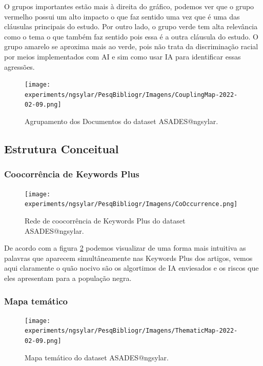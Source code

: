 O grupos importantes estão mais à direita do gráfico, podemos ver que o grupo vermelho possui um alto impacto o que faz sentido uma vez que é uma das cláusulas principais do estudo. Por outro lado, o grupo verde tem alta relevância como o tema o que também faz sentido pois essa é a outra cláusula do estudo. O grupo amarelo se aproxima mais ao verde, pois não trata da discriminação racial por meios implementados com AI e sim como usar IA para identificar essas agressões. 

\begin{figure}
    \centering
\texttt{[image: experiments/ngsylar/PesqBibliogr/Imagens/CouplingMap-2022-02-09.png]}
    \caption{Agrupamento dos Documentos do dataset ASADES@ngsylar.}
    \label{fig:ASADES@ngsylar:Coupling}
\end{figure}


\subsection{Estrutura Conceitual}

\subsubsection{Coocorrência de Keywords Plus}

\begin{figure}
    \centering
\texttt{[image: experiments/ngsylar/PesqBibliogr/Imagens/CoOccurrence.png]}
    \caption{Rede de coocorrência de Keywords Plus do dataset ASADES@ngsylar.}
    \label{fig:ASADES@ngsylar:CoOcorrenceKW}
\end{figure}

De acordo com a figura \ref{fig:ASADES@ngsylar:CoOcorrenceKW} podemos visualizar de uma forma mais intuitiva as palavras que aparecem simultâneamente nas Keywords Plus dos artigos, vemos aqui claramente o quão nocivo são os algortimos de IA enviesados e os riscos que eles apresentam para a população negra.

\subsubsection{Mapa temático}
\begin{figure}[H]
    \centering
\texttt{[image: experiments/ngsylar/PesqBibliogr/Imagens/ThematicMap-2022-02-09.png]}
    \caption{Mapa temático do dataset ASADES@ngsylar.}
    \label{fig:ASADES@ngsylar:ThematicMap}
\end{figure}


